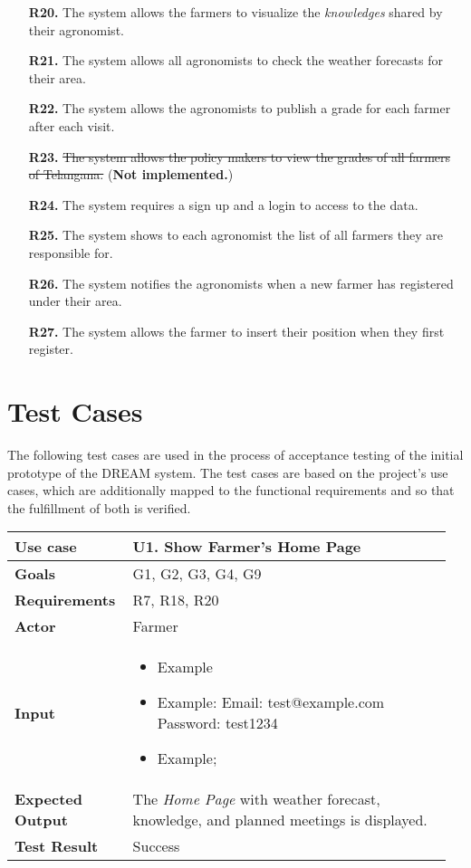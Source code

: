 \begin{enumerate}
	\item [\textbf{R20.}] The system allows the farmers to visualize the \textit{knowledges} shared by their agronomist.
	\item [\textbf{R21.}] The system allows all agronomists to check the weather forecasts for their area.
	\item [\textbf{R22.}] The system allows the agronomists to publish a grade for each farmer after each visit.
	\item [\textbf{R23.}] \sout{The system allows the policy makers to view the grades of all farmers of Telangana.} (\textbf{Not implemented.})
	\item [\textbf{R24.}] The system requires a sign up and a login to access to the data.
	\item [\textbf{R25.}] The system shows to each agronomist the list of all farmers they are responsible for.
	\item [\textbf{R26.}] The system notifies the agronomists when a new farmer has registered under their area.
	\item [\textbf{R27.}] The system allows the farmer to insert their position when they first register.
\end{enumerate}

\section{Test Cases}

The following test cases are used in the process of acceptance testing of the initial prototype of the DREAM system. The test cases are based on the project's use cases, which are additionally mapped to the functional requirements and so that the fulfillment of both is verified.

\begin{longtable}{@{}p{0.25\linewidth}p{0.71\linewidth}@{}}
	\toprule
	\textbf{Use case} & \textbf{U1.} Show Farmer's Home Page\\
	\midrule
	\textbf{Goals} & G1, G2, G3, G4, G9\\
	\midrule
	\textbf{Requirements} & R7, R18, R20\\
	\midrule
	\textbf{Actor} & Farmer\\
	\midrule
	\textbf{Input} & \begin{itemize}[leftmargin=.4cm,noitemsep,topsep=0pt,before=\vspace{-3mm},after=\vspace{-4mm}]
		\item Example
		\item Example:\newline
		Email: test@example.com\newline
		Password: test1234
		\item Example;
	\end{itemize}\\
	\midrule
	\textbf{Expected Output} & The \textit{Home Page} with weather forecast, knowledge, and planned meetings is displayed.\\
	\midrule
	\textbf{Test Result} & Success\\
	\bottomrule
\end{longtable}

